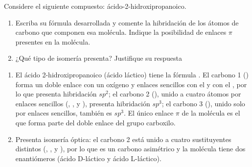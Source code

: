 \begin{exerciseEVAU}
    Considere el siguiente compuesto: ácido-2-hidroxipropanoico.

    \begin{enumerate}[label=\letraminuscula]
        \item Escriba su fórmula desarrollada y comente la hibridación de los átomos de carbono que componen esa molécula. Indique la posibilidad de enlaces \(\pi\) presentes en la molécula.
        \item ¿Qué tipo de isomería presenta? Justifique su respuesta
    \end{enumerate}

    \begin{solu}


        \begin{enumerate}[label=\letraminuscula]
            \item El ácido 2-hidroxipropanoico (ácido láctico) tiene la fórmula . El carbono 1 () forma un doble enlace con un oxígeno y enlaces sencillos con el  y con el , por lo que presenta hibridación \(sp^2\); el carbono 2 (), unido a cuatro átomos por enlaces sencillos (, ,  y ), presenta hibridación \(sp^3\); el carbono 3 (), unido solo por enlaces sencillos, también es \(sp^3\). El único enlace \(\pi\) de la molécula es el que forma parte del doble enlace  del grupo carboxilo.

            \item Presenta isomería óptica: el carbono 2 está unido a cuatro sustituyentes distintos (, ,  y ), por lo que es un carbono asimétrico y la molécula tiene dos enantiómeros (ácido D-láctico y ácido L-láctico).
        \end{enumerate}
    \end{solu}
\end{exerciseEVAU}

